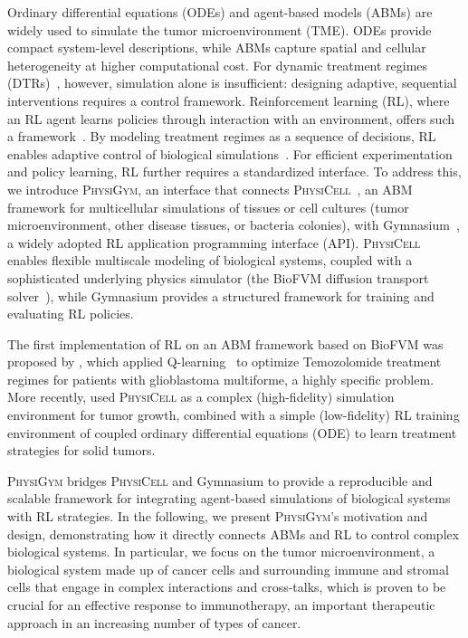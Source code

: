 \documentclass{article}
\newcommand{\physigym}{\textsc{PhysiGym}}
\newcommand{\physicell}{\textsc{PhysiCell}}
\begin{document}
Ordinary differential equations (ODEs) and agent-based models (ABMs) are widely
used to simulate the tumor microenvironment (TME). ODEs provide compact
system-level descriptions, while ABMs capture spatial and cellular
heterogeneity at higher computational cost. For dynamic treatment regimes
(DTRs)~\citep{gray1982arac}, however, simulation alone is insufficient:
designing adaptive, sequential interventions requires a control framework.
Reinforcement learning (RL), where an RL agent learns policies through
interaction with an environment, offers such a framework~\citep{barto1989learning}.
By modeling treatment regimes as a sequence of decisions, RL enables adaptive
control of biological simulations~\citep{chakraborty2014dynamic}. For efficient
experimentation and policy learning, RL further requires a standardized
interface. To address this, we introduce \physigym{}, an interface that connects
\physicell{}~\citep{ghaffarizadeh2018physicell}, an ABM framework for
multicellular simulations of tissues or cell cultures (tumor microenvironment,
other disease tissues, or bacteria colonies), with
Gymnasium~\citep{towers2024gymnasium}, a widely adopted RL application
programming interface (API).
\physicell{} enables flexible multiscale modeling of biological systems, coupled
with a sophisticated underlying physics simulator (the BioFVM diffusion
transport solver~\citep{ghaffarizadeh2016biofvm}), while Gymnasium provides a
structured framework for training and evaluating RL policies.

The first implementation of RL on an ABM framework based on BioFVM was proposed
by \citet{zade2020reinforcement}, which applied Q-learning~\citep{watkins1992q}
to optimize Temozolomide treatment regimes for patients with glioblastoma
multiforme, a highly specific problem.
More recently, \citet{aif2025failing} used \physicell{} as a complex
(high-fidelity) simulation environment for tumor growth, combined with a simple
(low-fidelity) RL training environment of coupled ordinary differential
equations (ODE) to learn treatment strategies for solid tumors.

\physigym{} bridges \physicell{} and Gymnasium to provide a reproducible and
scalable framework for integrating agent-based simulations of biological systems
with RL strategies. In the following, we present \physigym{}'s motivation and
design, demonstrating how it directly connects ABMs and RL to control complex
biological systems. In particular, we focus on the tumor microenvironment, a
biological system made up of cancer cells and surrounding immune and stromal
cells that engage in complex interactions and cross-talks, which is proven to be
crucial for an effective response to immunotherapy, an important therapeutic
approach in an increasing number of types of cancer.
\end{document}
